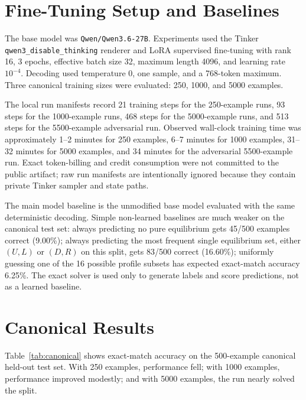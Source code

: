 \documentclass[11pt]{article}
\newcommand{\modelname}{\texttt{Qwen/\allowbreak Qwen3.6-27B}}
\begin{document}
\section{Fine-Tuning Setup and Baselines}

The base model was \modelname{}. Experiments used the Tinker \texttt{qwen3\_disable\_thinking} renderer and LoRA supervised fine-tuning \cite{hu2022lora} with rank 16, 3 epochs, effective batch size 32, maximum length 4096, and learning rate $10^{-4}$. Decoding used temperature 0, one sample, and a 768-token maximum. Three canonical training sizes were evaluated: 250, 1000, and 5000 examples.

The local run manifests record 21 training steps for the 250-example runs, 93 steps for the 1000-example runs, 468 steps for the 5000-example runs, and 513 steps for the 5500-example adversarial run. Observed wall-clock training time was approximately 1--2 minutes for 250 examples, 6--7 minutes for 1000 examples, 31--32 minutes for 5000 examples, and 34 minutes for the adversarial 5500-example run. Exact token-billing and credit consumption were not committed to the public artifact; raw run manifests are intentionally ignored because they contain private Tinker sampler and state paths.

The main model baseline is the unmodified base model evaluated with the same deterministic decoding. Simple non-learned baselines are much weaker on the canonical test set: always predicting no pure equilibrium gets 45/500 examples correct (9.00\%); always predicting the most frequent single equilibrium set, either $(U,L)$ or $(D,R)$ on this split, gets 83/500 correct (16.60\%); uniformly guessing one of the 16 possible profile subsets has expected exact-match accuracy 6.25\%. The exact solver is used only to generate labels and score predictions, not as a learned baseline.

\section{Canonical Results}

Table~\ref{tab:canonical} shows exact-match accuracy on the 500-example canonical held-out test set. With 250 examples, performance fell; with 1000 examples, performance improved modestly; and with 5000 examples, the run nearly solved the split.
\end{document}
